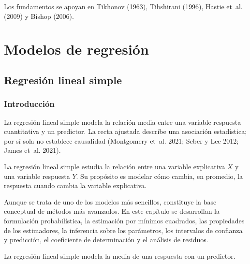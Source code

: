\documentclass[
  spanish,
  10.5pt,
  letterpaper,
  DIV=11,
  numbers=noendperiod,
  oneside,
  open=any]{scrreprt}
\theoremstyle{definition}
\theoremstyle{definition}
\theoremstyle{plain}
\theoremstyle{remark}
\begin{document}

Los fundamentos se apoyan en Tikhonov (1963), Tibshirani (1996), Hastie
et~al. (2009) y Bishop (2006).

\part{Modelos de regresión}

\chapter{\texorpdfstring{Regresión lineal
simple}{Regresión lineal simple}}\label{sec-regresion-lineal-simple}

\section*{Introducción}\label{introducciuxf3n-9}


La regresión lineal simple modela la relación media entre una variable
respuesta cuantitativa y un predictor. La recta ajustada describe una
asociación estadística; por sí sola no establece causalidad (Montgomery
et~al. 2021; Seber y Lee 2012; James et~al. 2021).

La regresión lineal simple estudia la relación entre una variable
explicativa \(X\) y una variable respuesta \(Y\). Su propósito es
modelar cómo cambia, en promedio, la respuesta cuando cambia la variable
explicativa.

Aunque se trata de uno de los modelos más sencillos, constituye la base
conceptual de métodos más avanzados. En este capítulo se desarrollan la
formulación probabilística, la estimación por mínimos cuadrados, las
propiedades de los estimadores, la inferencia sobre los parámetros, los
intervalos de confianza y predicción, el coeficiente de determinación y
el análisis de residuos.

\begin{tcolorbox}[enhanced jigsaw, arc=.35mm, bottomrule=.15mm, bottomtitle=1mm, breakable, colback=white, colbacktitle=quarto-callout-important-color!10!white, colframe=quarto-callout-important-color-frame, coltitle=black, left=2mm, leftrule=.75mm, opacityback=0, opacitybacktitle=0.6, rightrule=.15mm, title=\textcolor{quarto-callout-important-color}{\faExclamation}\hspace{0.5em}{Definición esencial}, titlerule=0mm, toprule=.15mm, toptitle=1mm]

La regresión lineal simple modela la media de una respuesta con un
predictor.

\end{tcolorbox}
\end{document}
